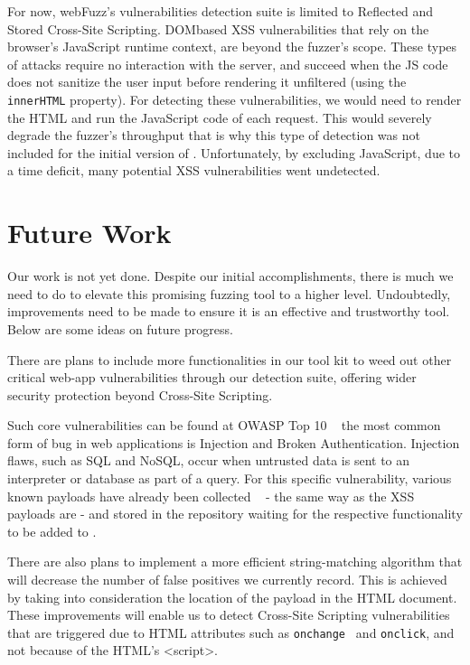 For now, webFuzz's vulnerabilities detection suite is limited to Reflected and Stored Cross-Site Scripting. DOMbased XSS vulnerabilities that rely on the browser's JavaScript runtime context, are beyond the fuzzer's scope. These types of attacks require no interaction with
the server, and succeed when the JS code does not sanitize the user input before rendering it unfiltered (\eg using the {\tt innerHTML} property). For detecting these vulnerabilities, we would need to render the HTML and run the JavaScript code of each request. This would severely degrade the fuzzer's throughput that is why this type of detection was not included for the initial version of \pname{}.  Unfortunately, by excluding JavaScript, due to a time deficit, many potential XSS vulnerabilities went undetected.

\section{Future Work}
Our work is not yet done. Despite our initial accomplishments, there is much we need to do to elevate this promising fuzzing tool to a higher level. Undoubtedly, improvements need to be made to ensure it is an effective and trustworthy tool. Below are some ideas on future progress.

There are plans to include more functionalities in our tool kit to weed out other critical web-app vulnerabilities through our detection suite, offering wider security protection beyond Cross-Site Scripting.

Such core vulnerabilities can be found at OWASP Top 10 ~\cite{owasp2017} the most common form of bug in web applications is Injection and Broken Authentication. Injection flaws, such as SQL and NoSQL, occur when untrusted data is sent to an interpreter or database as part of a query. For this specific vulnerability, various known payloads have already been collected ~\cite{seclist} - the same way as the XSS payloads are - and stored in the repository waiting for the respective functionality to be added to \pname{}.

There are also plans to implement a more efficient string-matching algorithm that will decrease the number of false positives we currently record. This is achieved by taking into consideration the location of the payload in the HTML document. These improvements will enable us to detect Cross-Site Scripting vulnerabilities that are triggered due to HTML attributes such as {\tt onchange } and {\tt onclick}, and not because of the HTML's <script>.

